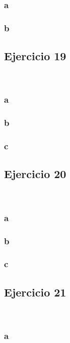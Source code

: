 \documentclass{article}
\begin{document}
\subsubsection*{a}

\subsubsection*{b}

\subsection*{Ejercicio 19}

\

\subsubsection*{a}

\subsubsection*{b}

\subsubsection*{c}

\subsection*{Ejercicio 20}

\

\subsubsection*{a}

\subsubsection*{b}

\subsubsection*{c}

\subsection*{Ejercicio 21}

\

\subsubsection*{a}
\end{document}

